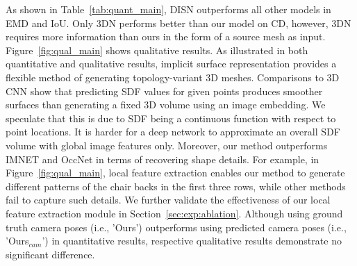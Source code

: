 As shown in Table~\ref{tab:quant_main}, DISN outperforms all other models in EMD and IoU. Only 3DN performs better than our model on CD, however, 3DN requires more information than ours in the form of a source mesh as input. Figure~\ref{fig:qual_main} shows qualitative results. As illustrated in both quantitative and qualitative results, implicit surface representation provides a flexible method of generating topology-variant 3D meshes. Comparisons to 3D CNN show that predicting SDF values for given points produces smoother surfaces than generating a fixed 3D volume using an image embedding. We speculate that this is due to SDF being a continuous function with respect to point locations. It is harder for a deep network to approximate an overall SDF volume with global image features only. Moreover, our method outperforms IMNET and OccNet in terms of recovering shape details. For example, in Figure~\ref{fig:qual_main}, local feature extraction enables our method to generate different patterns of the chair backs in the first three rows, while other methods fail to capture such details. We further validate the effectiveness of our local feature extraction module in Section~\ref{sec:exp:ablation}. Although using ground truth camera poses (i.e., 'Ours') outperforms using predicted camera poses (i.e., 'Ours$_{cam}$') in quantitative results, respective qualitative results demonstrate no significant difference. 


